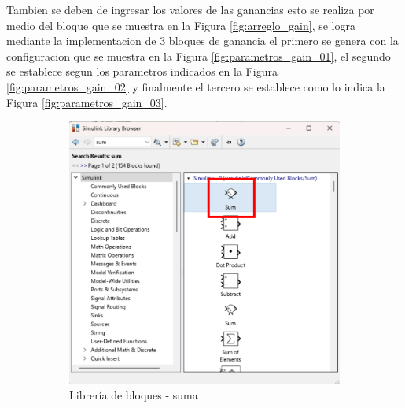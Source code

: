 Tambien se deben de ingresar los valores de las ganancias esto se realiza por medio del bloque que se muestra en la Figura \ref{fig:arreglo_gain}, se logra mediante la implementacion de 3 bloques de ganancia el primero se genera con la configuracion que se muestra en la Figura \ref{fig:parametros_gain_01}, el segundo se establece segun los parametros indicados en la Figura \ref{fig:parametros_gain_02} y finalmente el tercero se establece como lo indica la Figura \ref{fig:parametros_gain_03}. 

\begin{figure}[htbp]
    \centering
    \begin{subfigure}[b]{0.35\textwidth}
        \centering
        \includegraphics[width=\textwidth]{fig/Capitulo5/Caso_de_estudio_PID/lib_suma.pdf}
        \caption{Librería de bloques - suma}
        \label{fig:lib_bloques_add}
    \end{subfigure}
    \hfill
    \begin{subfigure}[b]{0.45\textwidth}
        \centering

\end{subfigure}
\end{figure}
